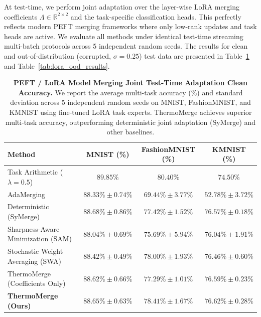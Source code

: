 At test-time, we perform joint adaptation over the layer-wise LoRA merging coefficients $\Lambda \in \mathbb{R}^{2 \times 2}$ and the task-specific classification heads.
This perfectly reflects modern PEFT merging frameworks where only low-rank updates and task heads are active.
We evaluate all methods under identical test-time streaming multi-batch protocols across 5 independent random seeds.
The results for clean and out-of-distribution (corrupted, $\sigma=0.25$) test data are presented in Table~\ref{tab:lora_results} and Table~\ref{tab:lora_ood_results}.

\begin{table}[t]
\caption{\textbf{PEFT / LoRA Model Merging Joint Test-Time Adaptation Clean Accuracy.} We report the average multi-task accuracy (\%) and standard deviation across 5 independent random seeds on MNIST, FashionMNIST, and KMNIST using fine-tuned LoRA task experts. ThermoMerge achieves superior multi-task accuracy, outperforming deterministic joint adaptation (SyMerge) and other baselines.}
\label{tab:lora_results}
\vskip 0.15in
\begin{center}
\begin{small}
\begin{sc}
\begin{tabular}{lccc}
\toprule
Method & MNIST (\%) & FashionMNIST (\%) & KMNIST (\%) \\
\midrule
Task Arithmetic ($\lambda=0.5$) & $89.85\%$ & $80.40\%$ & $74.50\%$ \\
AdaMerging~\cite{yang2024adamerging} & $88.33\% \pm 0.74\%$ & $69.44\% \pm 3.77\%$ & $52.78\% \pm 3.72\%$ \\
Deterministic (SyMerge) & $88.68\% \pm 0.86\%$ & $77.42\% \pm 1.52\%$ & $76.57\% \pm 0.18\%$ \\
Sharpness-Aware Minimization (SAM) & $88.04\% \pm 0.69\%$ & $75.69\% \pm 5.94\%$ & $76.04\% \pm 1.91\%$ \\
Stochastic Weight Averaging (SWA) & $88.42\% \pm 0.49\%$ & $78.00\% \pm 1.93\%$ & $76.46\% \pm 0.60\%$ \\
ThermoMerge (Coefficients Only) & $88.62\% \pm 0.66\%$ & $77.29\% \pm 1.01\%$ & $76.59\% \pm 0.23\%$ \\
\textbf{ThermoMerge (Ours)} & $\mathbf{88.65\% \pm 0.63\%}$ & $\mathbf{78.41\% \pm 1.67\%}$ & $\mathbf{76.62\% \pm 0.28\%}$ \\
\bottomrule
\end{tabular}
\end{sc}
\end{small}
\end{center}
\vskip -0.1in
\end{table}

